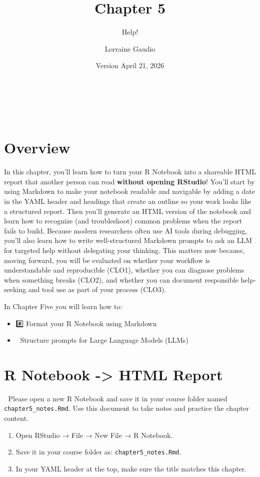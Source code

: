 \documentclass[
  12pt,
]{scrreprt}
\title{Chapter 5}
\subtitle{Help!}
\author{Lorraine Gaudio}
\date{Version April 21, 2026}
\renewcommand{\maketitle}{
  \thispagestyle{titlepage}  %
  \begin{center}
    \vspace*{3cm}
    {\Huge\sffamily\bfseries\color{boisestateblue}\thetitle}\\[4cm]

    \vspace*{1cm}
    {\Large\sffamily\color{boisestateblue}\theauthor}\\[0.5cm]
    {\large\sffamily\color{boisestateblue}\thedate}
  \end{center}
  \clearpage
  \thispagestyle{empty}  %
  \pagenumbering{arabic}
  \setcounter{page}{1}
}
\begin{document}
\maketitle

{
\hypersetup{linkcolor=}
\setcounter{tocdepth}{1}
\tableofcontents
}
\chapter{Overview}\label{overview}

In this chapter, you'll learn how to turn your R Notebook into a
shareable HTML report that another person can read \textbf{without
opening RStudio}! You'll start by using Markdown to make your notebook
readable and navigable by adding a date in the YAML header and headings
that create an outline so your work looks like a structured report. Then
you'll generate an HTML version of the notebook and learn how to
recognize (and troubleshoot) common problems when the report fails to
build. Because modern researchers often use AI tools during debugging,
you'll also learn how to write well-structured Markdown prompts to ask
an LLM for targeted help without delegating your thinking. This matters
now because, moving forward, you will be evaluated on whether your
workflow is understandable and reproducible (CLO1), whether you can
diagnose problems when something breaks (CLO2), and whether you can
document responsible help-seeking and tool use as part of your process
(CLO3).

In Chapter Five you will learn how to:

\begin{itemize}
\item
  \#️⃣ Format your R Notebook using Markdown
\item
  📐 Structure prompts for Large Language Models (LLMs)
\end{itemize}

\chapter{R Notebook -\textgreater{} HTML
Report}\label{r-notebook---html-report}

🎯 Please open a new R Notebook and save it in your course folder named
\texttt{chapter5\_notes.Rmd}. Use this document to take notes and
practice the chapter content.

\begin{enumerate}
\def\labelenumi{\arabic{enumi}.}
\item
  Open RStudio → File → New File → R Notebook.
\item
  Save it in your course folder as: \texttt{chapter5\_notes.Rmd}.
\item
  In your YAML header at the top, make sure the title matches this
  chapter.
\end{enumerate}
\end{document}
